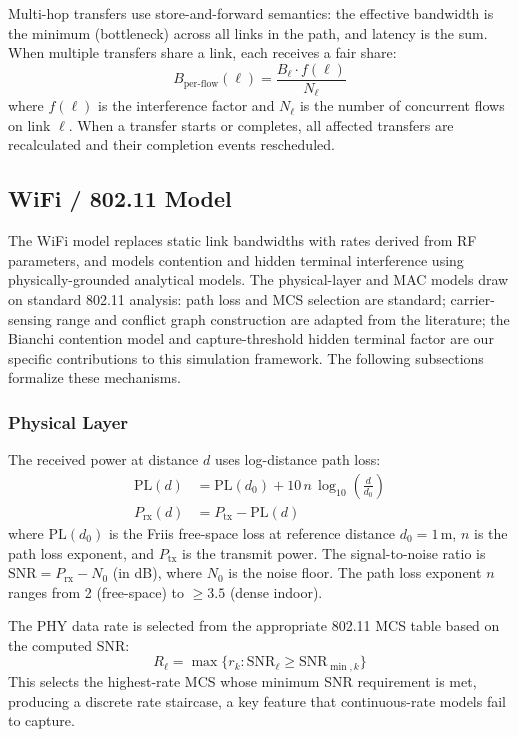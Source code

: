 \documentclass[conference]{IEEEtran}
\begin{document}
Multi-hop transfers use store-and-forward semantics: the effective bandwidth
is the minimum (bottleneck) across all links in the path, and latency is the
sum.  When multiple transfers share a link, each receives a fair share:
\begin{equation}
B_\text{per-flow}(\ell) = \frac{B_\ell \cdot f(\ell)}{N_\ell}
\label{eq:fair_share}
\end{equation}
where $f(\ell)$ is the interference factor and $N_\ell$ is the number of
concurrent flows on link $\ell$.  When a transfer starts or completes, all
affected transfers are recalculated and their completion events rescheduled.

\subsection{WiFi / 802.11 Model}
\label{sec:wifi}

The WiFi model replaces static link bandwidths with rates derived from RF
parameters, and models contention and hidden terminal interference using
physically-grounded analytical models.  The physical-layer and MAC models
draw on standard 802.11 analysis: path loss and MCS selection are standard;
carrier-sensing range and conflict graph construction are adapted from the
literature; the Bianchi contention model and capture-threshold hidden
terminal factor are our specific contributions to this simulation framework.
The following subsections formalize these mechanisms.

\subsubsection{Physical Layer}

The received power at distance $d$ uses log-distance path loss:
\begin{align}
\text{PL}(d) &= \text{PL}(d_0) + 10\,n\,\log_{10}\!\left(\frac{d}{d_0}\right) \label{eq:pathloss} \\
P_\text{rx}(d) &= P_\text{tx} - \text{PL}(d) \label{eq:rxpower}
\end{align}
where $\text{PL}(d_0)$ is the Friis free-space loss at reference distance
$d_0 = 1$\,m, $n$ is the path loss exponent, and $P_\text{tx}$ is the
transmit power.  The signal-to-noise ratio is $\text{SNR} = P_\text{rx} - N_0$
(in dB), where $N_0$ is the noise floor.  The path loss exponent $n$ ranges from 2 (free-space) to $\geq 3.5$
(dense indoor).

The PHY data rate is selected from the appropriate 802.11 MCS table based
on the computed SNR:
\begin{equation}
R_\ell = \max\{r_k : \text{SNR}_\ell \geq \text{SNR}_{\min,k}\}
\label{eq:mcs}
\end{equation}
This selects the highest-rate MCS whose minimum SNR requirement is met,
producing a discrete rate staircase, a key feature that continuous-rate
models fail to capture.
\end{document}
